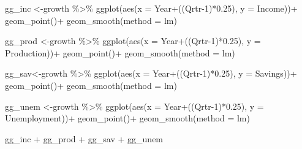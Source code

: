 \documentclass[
  letterpaper,
  DIV=11,
  numbers=noendperiod]{scrartcl}
\newenvironment{Shaded}{\begin{snugshade}}{\end{snugshade}}
\newcommand{\AttributeTok}[1]{\textcolor[rgb]{0.40,0.45,0.13}{#1}}
\newcommand{\DecValTok}[1]{\textcolor[rgb]{0.68,0.00,0.00}{#1}}
\newcommand{\FloatTok}[1]{\textcolor[rgb]{0.68,0.00,0.00}{#1}}
\newcommand{\FunctionTok}[1]{\textcolor[rgb]{0.28,0.35,0.67}{#1}}
\newcommand{\NormalTok}[1]{\textcolor[rgb]{0.00,0.23,0.31}{#1}}
\newcommand{\OtherTok}[1]{\textcolor[rgb]{0.00,0.23,0.31}{#1}}
\newcommand{\SpecialCharTok}[1]{\textcolor[rgb]{0.37,0.37,0.37}{#1}}
\newcommand{\StringTok}[1]{\textcolor[rgb]{0.13,0.47,0.30}{#1}}
\begin{document}
\begin{Shaded}
\begin{Highlighting}[]
\NormalTok{gg\_inc }\OtherTok{\textless{}{-}}\NormalTok{growth }\SpecialCharTok{\%\textgreater{}\%}
  \FunctionTok{ggplot}\NormalTok{(}\FunctionTok{aes}\NormalTok{(}\AttributeTok{x =}\NormalTok{ Year}\SpecialCharTok{+}\NormalTok{((Qrtr}\DecValTok{{-}1}\NormalTok{)}\SpecialCharTok{*}\FloatTok{0.25}\NormalTok{), }\AttributeTok{y =}\NormalTok{ Income))}\SpecialCharTok{+}
  \FunctionTok{geom\_point}\NormalTok{()}\SpecialCharTok{+}
  \FunctionTok{geom\_smooth}\NormalTok{(}\AttributeTok{method =} \StringTok{\textquotesingle{}lm\textquotesingle{}}\NormalTok{)}

\NormalTok{gg\_prod }\OtherTok{\textless{}{-}}\NormalTok{growth }\SpecialCharTok{\%\textgreater{}\%}
  \FunctionTok{ggplot}\NormalTok{(}\FunctionTok{aes}\NormalTok{(}\AttributeTok{x =}\NormalTok{ Year}\SpecialCharTok{+}\NormalTok{((Qrtr}\DecValTok{{-}1}\NormalTok{)}\SpecialCharTok{*}\FloatTok{0.25}\NormalTok{), }\AttributeTok{y =}\NormalTok{ Production))}\SpecialCharTok{+}
  \FunctionTok{geom\_point}\NormalTok{()}\SpecialCharTok{+}
  \FunctionTok{geom\_smooth}\NormalTok{(}\AttributeTok{method =} \StringTok{\textquotesingle{}lm\textquotesingle{}}\NormalTok{)}

\NormalTok{gg\_sav}\OtherTok{\textless{}{-}}\NormalTok{growth }\SpecialCharTok{\%\textgreater{}\%}
  \FunctionTok{ggplot}\NormalTok{(}\FunctionTok{aes}\NormalTok{(}\AttributeTok{x =}\NormalTok{ Year}\SpecialCharTok{+}\NormalTok{((Qrtr}\DecValTok{{-}1}\NormalTok{)}\SpecialCharTok{*}\FloatTok{0.25}\NormalTok{), }\AttributeTok{y =}\NormalTok{ Savings))}\SpecialCharTok{+}
  \FunctionTok{geom\_point}\NormalTok{()}\SpecialCharTok{+}
  \FunctionTok{geom\_smooth}\NormalTok{(}\AttributeTok{method =} \StringTok{\textquotesingle{}lm\textquotesingle{}}\NormalTok{)}

\NormalTok{gg\_unem }\OtherTok{\textless{}{-}}\NormalTok{growth }\SpecialCharTok{\%\textgreater{}\%}
  \FunctionTok{ggplot}\NormalTok{(}\FunctionTok{aes}\NormalTok{(}\AttributeTok{x =}\NormalTok{ Year}\SpecialCharTok{+}\NormalTok{((Qrtr}\DecValTok{{-}1}\NormalTok{)}\SpecialCharTok{*}\FloatTok{0.25}\NormalTok{), }\AttributeTok{y =}\NormalTok{ Unemployment))}\SpecialCharTok{+}
  \FunctionTok{geom\_point}\NormalTok{()}\SpecialCharTok{+}
  \FunctionTok{geom\_smooth}\NormalTok{(}\AttributeTok{method =} \StringTok{\textquotesingle{}lm\textquotesingle{}}\NormalTok{)}

\NormalTok{gg\_inc }\SpecialCharTok{+}\NormalTok{ gg\_prod }\SpecialCharTok{+}\NormalTok{ gg\_sav }\SpecialCharTok{+}\NormalTok{ gg\_unem}
\end{Highlighting}
\end{Shaded}
\end{document}
